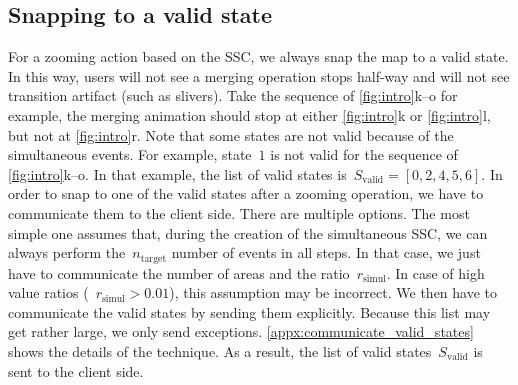\documentclass[twocolumn]{svjour3}          %
\begin{document}
\subsection{Snapping to a valid state}
\label{sec:snap}

For a zooming action based on the SSC, 
we always snap the map to a valid state.
In this way, users will not see a merging operation stops half-way
and will not see transition artifact (such as slivers).
Take the sequence of \fig\ref{fig:intro}k--o for example, 
the merging animation should stop at 
either \ref{fig:intro}k or \ref{fig:intro}l,
but not at \ref{fig:intro}r.
Note that some states are not valid because of the simultaneous events.
For example, state~$1$ is not valid 
for the sequence of \fig\ref{fig:intro}k--o.
In that example, the list of valid states 
is~$S_\mathrm{valid} = [0, 2, 4, 5, 6]$.
In order to snap to one of the valid states after a zooming operation,
we have to communicate them to the client side. 
There are multiple options. 
The most simple one assumes that, 
during the creation of the simultaneous SSC, 
we can always perform the~$n_\mathrm{target}$ number of events in all steps. 
In that case, we just have to communicate 
the number of areas and the ratio~$r_\mathrm{simul}$. 
In case of high value ratios (\eg~$r_\mathrm{simul} > 0.01$), 
this assumption may be incorrect. 
We then have to communicate the valid states by sending them explicitly. 
Because this list may get rather large,
we only send exceptions.
\appx\ref{appx:communicate_valid_states} shows the details of the technique.
As a result, the list of valid states~$S_\mathrm{valid}$ is sent to the client side.
\end{document}
